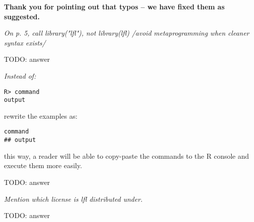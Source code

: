 \documentclass{article}
\newcommand{\todo}[1]{{\color{red} TODO: #1}}
\begin{document}
{ \bf Thank you for pointing out that typos -- we have fixed them as suggested. }

{ \it On p. 5, call library("lfl"), not library(lfl) /avoid metaprogramming when cleaner syntax exists/ }

\todo{answer}

{ \it Instead of:
\begin{verbatim}
R> command
output
\end{verbatim}
rewrite the examples as:
\begin{verbatim}
command
## output
\end{verbatim}
this way, a reader will be able to copy-paste the commands to the R console and execute them more easily.
}

\todo{answer}

{ \it Mention which license is lfl distributed under. }

\todo{answer}
\end{document}
